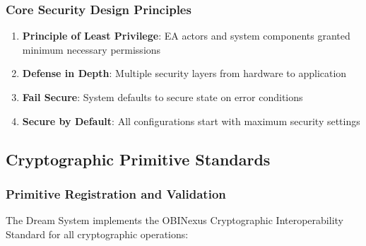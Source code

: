 \documentclass[12pt,a4paper]{article}
\begin{document}
\subsubsection{Core Security Design Principles}

\begin{enumerate}
    \item \textbf{Principle of Least Privilege}: EA actors and system components granted minimum necessary permissions
    \item \textbf{Defense in Depth}: Multiple security layers from hardware to application
    \item \textbf{Fail Secure}: System defaults to secure state on error conditions
    \item \textbf{Secure by Default}: All configurations start with maximum security settings
\end{enumerate}

\subsection{Cryptographic Primitive Standards}

\subsubsection{Primitive Registration and Validation}

The Dream System implements the OBINexus Cryptographic Interoperability Standard for all cryptographic operations:
\end{document}
